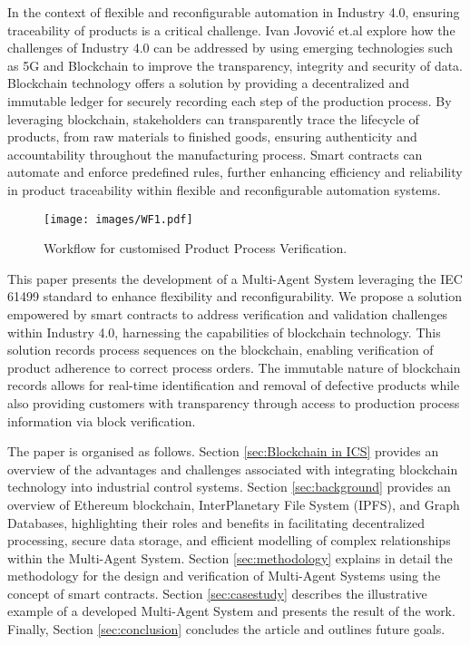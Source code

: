 \documentclass[conference]{IEEEtran}
\begin{document}
In the context of flexible and reconfigurable automation in Industry 4.0, ensuring traceability of products is a critical challenge. Ivan Jovović et.al \cite{jovovic2019innovative} explore how the challenges of Industry 4.0 can be addressed by using emerging technologies such as 5G and Blockchain to improve the transparency, integrity and security of data. Blockchain technology offers a solution by providing a decentralized and immutable ledger for securely recording each step of the production process. By leveraging blockchain, stakeholders can transparently trace the lifecycle of products, from raw materials to finished goods, ensuring authenticity and accountability throughout the manufacturing process. Smart contracts \cite{oliva2020exploratory} can automate and enforce predefined rules, further enhancing efficiency and reliability in product traceability within flexible and reconfigurable automation systems.

\begin{figure*}
    \texttt{[image: images/WF1.pdf]}
    \caption{Workflow for customised Product Process Verification.}
    \label{fig:workflow_diagram}
\end{figure*}


This paper presents the development of a Multi-Agent System leveraging the IEC 61499 standard to enhance flexibility and reconfigurability. We propose a solution empowered by smart contracts to address verification and validation challenges within Industry 4.0, harnessing the capabilities of blockchain technology. This solution records process sequences on the blockchain, enabling verification of product adherence to correct process orders. The immutable nature of blockchain records allows for real-time identification and removal of defective products while also providing customers with transparency through access to production process information via block verification.


The paper is organised as follows. Section \ref{sec:Blockchain in ICS} provides an overview of the advantages and challenges associated with integrating blockchain technology into industrial control systems. Section \ref{sec:background} provides an overview of Ethereum blockchain, InterPlanetary File System (IPFS), and Graph Databases, highlighting their roles and benefits in facilitating decentralized processing, secure data storage, and efficient modelling of complex relationships within the Multi-Agent System. Section \ref{sec:methodology} explains in detail the methodology for the design and verification of Multi-Agent Systems using the concept of smart contracts. Section \ref{sec:casestudy}  describes the illustrative example of a developed Multi-Agent System and presents the result of the work. Finally, Section \ref{sec:conclusion} concludes the article and outlines future goals.
\end{document}
